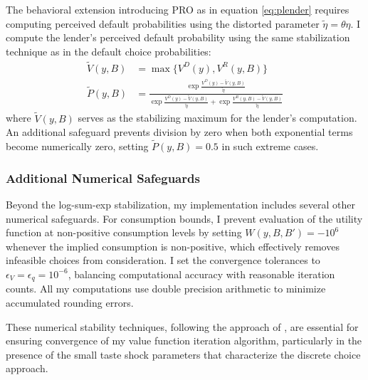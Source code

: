 \documentclass[12pt]{article}
\theoremstyle{plain}
\begin{document}
The behavioral extension introducing PRO as in equation \eqref{eq:plender}
requires computing perceived default probabilities using the distorted
parameter $\tilde{\eta} = \theta \eta$. I compute the lender's perceived
default probability using the same stabilization technique as in the default
choice probabilities:
\begin{align}
	\tilde{V}(y,B) & = \max\{V^D(y), V^R(y,B)\}                                                                                                                                 \\
	\tilde{P}(y,B) & = \frac{\exp\frac{V^D(y)-\tilde{V}(y,B)}{\tilde{\eta}}}{\exp\frac{V^D(y)-\tilde{V}(y,B)}{\tilde{\eta}} + \exp\frac{V^R(y,B)-\tilde{V}(y,B)}{\tilde{\eta}}}
\end{align}
where $\tilde{V}(y,B)$ serves as the stabilizing maximum for the lender's
computation. An additional safeguard prevents division by zero when both
exponential terms become numerically zero, setting $\tilde{P}(y,B) = 0.5$ in
such extreme cases.

\subsubsection{Additional Numerical Safeguards}

Beyond the log-sum-exp stabilization, my implementation includes several other
numerical safeguards. For consumption bounds, I prevent evaluation of the
utility function at non-positive consumption levels by setting $W(y,B,B') =
	-10^6$ whenever the implied consumption is non-positive, which effectively
removes infeasible choices from consideration. I set the convergence tolerances
to $\epsilon_V = \epsilon_q = 10^{-6}$, balancing computational accuracy with
reasonable iteration counts. All my computations use double precision
arithmetic to minimize accumulated rounding errors.

These numerical stability techniques, following the approach of
\citet{MIHALACHEOREEF2024}, are essential for ensuring convergence of my value
function iteration algorithm, particularly in the presence of the small taste
shock parameters that characterize the discrete choice approach.



\end{document}
